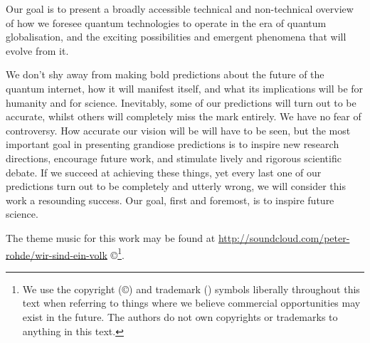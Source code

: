 Our goal is to present a broadly accessible technical and non-technical overview of how we foresee quantum technologies to operate in the era of quantum globalisation, and the exciting possibilities and emergent phenomena that will evolve from it.

We don't shy away from making bold predictions about the future of the quantum internet, how it will manifest itself, and what its implications will be for humanity and for science. Inevitably, some of our predictions will turn out to be accurate, whilst others will completely miss the mark entirely. We have no fear of controversy. How accurate our vision will be will have to be seen, but the most important goal in presenting grandiose predictions is to inspire new research directions, encourage future work, and stimulate lively and rigorous scientific debate. If we succeed at achieving these things, yet every last one of our predictions turn out to be completely and utterly wrong, we will consider this work a resounding success. Our goal, first and foremost, is to inspire future science.

The theme music for this work may be found at \href{http://soundcloud.com/peter-rohde/wir-sind-ein-volk}{http://soundcloud.com/peter-rohde/wir-sind-ein-volk} \copyright{}\footnote{We use the copyright (\copyright) and trademark (\texttrademark) symbols liberally throughout this text when referring to things where we believe commercial opportunities may exist in the future. The authors do not own copyrights or trademarks to anything in this text.}.